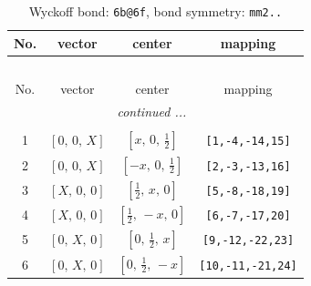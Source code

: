 \documentclass[fleqn,8pt]{jsarticle}
\begin{document}
\renewcommand{\arraystretch}{1.2}
\begin{longtable}{cccc}
\caption{Wyckoff bond: {\tt 6b@6f}, bond symmetry: {\tt mm2..}}
 \\
 \hline \hline
No. & vector & center & mapping \\ \hline \endfirsthead

\multicolumn{3}{l}{\tablename\ \thetable{}} \\
 \hline \hline
No. & vector & center & mapping \\ \hline \endhead

 \hline \hline
\multicolumn{3}{r}{\footnotesize\it continued ...} \\ \endfoot

 \hline \hline
\multicolumn{3}{r}{} \\ \endlastfoot

1 & $\left[ 0,\, 0,\, X \right]$ & $\left[ x,\, 0,\, \frac{1}{2} \right]$ & {\tt [1,-4,-14,15]} \\ \hline
2 & $\left[ 0,\, 0,\, X \right]$ & $\left[ - x,\, 0,\, \frac{1}{2} \right]$ & {\tt [2,-3,-13,16]} \\ \hline
3 & $\left[ X,\, 0,\, 0 \right]$ & $\left[ \frac{1}{2},\, x,\, 0 \right]$ & {\tt [5,-8,-18,19]} \\ \hline
4 & $\left[ X,\, 0,\, 0 \right]$ & $\left[ \frac{1}{2},\, - x,\, 0 \right]$ & {\tt [6,-7,-17,20]} \\ \hline
5 & $\left[ 0,\, X,\, 0 \right]$ & $\left[ 0,\, \frac{1}{2},\, x \right]$ & {\tt [9,-12,-22,23]} \\ \hline
6 & $\left[ 0,\, X,\, 0 \right]$ & $\left[ 0,\, \frac{1}{2},\, - x \right]$ & {\tt [10,-11,-21,24]} \\
\end{longtable}
\renewcommand{\arraystretch}{1.2}
\end{document}
